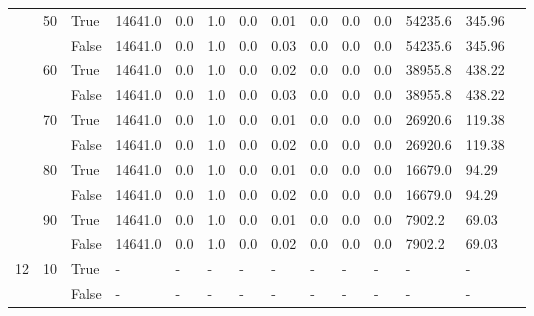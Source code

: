 \begin{appendices}
\begin{landscape}
\begin{small}
\begin{longtable}[c]{@{}lll|ll|ll|ll|ll|lll@{}}
   & 50 & True  & 14641.0         & 0.0            & 1.0           & 0.0           & 0.01          & 0.0           & 0.0           & 0.0           & 54235.6       & 345.96      &  \\
   &    & False & 14641.0         & 0.0            & 1.0           & 0.0           & 0.03          & 0.0           & 0.0           & 0.0           & 54235.6       & 345.96      &  \\
   & 60 & True  & 14641.0         & 0.0            & 1.0           & 0.0           & 0.02          & 0.0           & 0.0           & 0.0           & 38955.8       & 438.22      &  \\
   &    & False & 14641.0         & 0.0            & 1.0           & 0.0           & 0.03          & 0.0           & 0.0           & 0.0           & 38955.8       & 438.22      &  \\
   & 70 & True  & 14641.0         & 0.0            & 1.0           & 0.0           & 0.01          & 0.0           & 0.0           & 0.0           & 26920.6       & 119.38      &  \\
   &    & False & 14641.0         & 0.0            & 1.0           & 0.0           & 0.02          & 0.0           & 0.0           & 0.0           & 26920.6       & 119.38      &  \\
   & 80 & True  & 14641.0         & 0.0            & 1.0           & 0.0           & 0.01          & 0.0           & 0.0           & 0.0           & 16679.0       & 94.29       &  \\
   &    & False & 14641.0         & 0.0            & 1.0           & 0.0           & 0.02          & 0.0           & 0.0           & 0.0           & 16679.0       & 94.29       &  \\
   & 90 & True  & 14641.0         & 0.0            & 1.0           & 0.0           & 0.01          & 0.0           & 0.0           & 0.0           & 7902.2        & 69.03       &  \\
   &    & False & 14641.0         & 0.0            & 1.0           & 0.0           & 0.02          & 0.0           & 0.0           & 0.0           & 7902.2        & 69.03       &  \\
  \midrule
12 & 10 & True  & -               & -              & -             & -             & -             & -             & -             & -             & -             & -           &  \\
   &    & False & -               & -              & -             & -             & -             & -             & -             & -             & -             & -           &  \\

\end{longtable}
\end{small}
\end{landscape}
\end{appendices}

